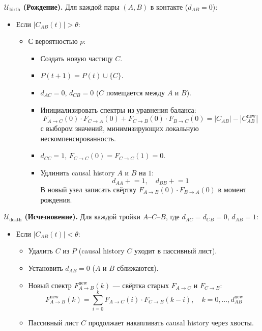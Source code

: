 \documentclass[11pt,a4paper]{article}
\theoremstyle{definition}
\begin{document}
\textbf{$\mathcal{U}_{\text{birth}}$ (Рождение).}
Для каждой пары $(A, B)$ в контакте ($d_{AB} = 0$):
\begin{itemize}
    \item Если $|C_{AB}(t)| > \theta$:
    \begin{itemize}
        \item С вероятностью $p$:
        \begin{itemize}
            \item Создать новую частицу $C$.
            \item $P(t+1) = P(t) \cup \{C\}$.
            \item $d_{AC} = 0$, $d_{CB} = 0$ ($C$ помещается между $A$ и $B$).
            \item Инициализировать спектры из уравнения баланса:
            \begin{equation}
                F_{A \to C}(0) \cdot F_{C \to A}(0) + F_{C \to B}(0) \cdot F_{B \to C}(0) = |C_{AB}| - |C_{AB}^{\text{new}}|
            \end{equation}
            с выбором значений, минимизирующих локальную нескомпенсированность.
            \item $d_{CC} = 1$, $F_{C \to C}(0) = F_{C \to C}(1) = 0$.
            \item Удлинить causal history $A$ и $B$ на $1$:
            \begin{equation}
                d_{AA} \mathrel{+}= 1, \quad d_{BB} \mathrel{+}= 1
            \end{equation}
            В новый узел записать свёртку $F_{A \to B}(0) \cdot F_{B \to A}(0)$ в момент рождения.
        \end{itemize}
    \end{itemize}
\end{itemize}

\textbf{$\mathcal{U}_{\text{death}}$ (Исчезновение).}
Для каждой тройки $A$--$C$--$B$, где $d_{AC} = d_{CB} = 0$, $d_{AB} = 1$:
\begin{itemize}
    \item Если $|C_{AB}(t)| < \theta$:
    \begin{itemize}
        \item Удалить $C$ из $P$ (causal history $C$ уходит в пассивный лист).
        \item Установить $d_{AB} = 0$ ($A$ и $B$ сближаются).
        \item Новый спектр $F_{A \to B}^{\text{new}}(k)$ --- свёртка старых $F_{A \to C}$ и $F_{C \to B}$:
        \begin{equation}
            F_{A \to B}^{\text{new}}(k) = \sum_{i=0}^{k} F_{A \to C}(i) \cdot F_{C \to B}(k-i), \quad k = 0, \dots, d_{AB}^{\text{new}}
        \end{equation}
        \item Пассивный лист $C$ продолжает накапливать causal history через хвосты.
    \end{itemize}
\end{itemize}
\end{document}

